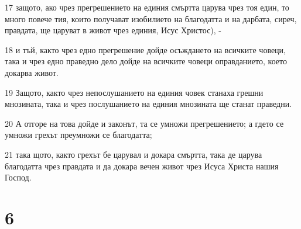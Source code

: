 \par 17 защото, ако чрез прегрешението на единия смъртта царува чрез тоя един, то много повече тия, които получават изобилието на благодатта и на дарбата, сиреч, правдата, ще царуват в живот чрез единия, Исус Христос), -
\par 18 и тъй, както чрез едно прегрешение дойде осъждането на всичките човеци, така и чрез едно праведно дело дойде на всичките човеци оправданието, което докарва живот.
\par 19 Защото, както чрез непослушанието на единия човек станаха грешни мнозината, така и чрез послушанието на единия мнозината ще станат праведни.
\par 20 А отгоре на това дойде и законът, та се умножи прегрешението; а гдето се умножи грехът преумножи се благодатта;
\par 21 така щото, както грехът бе царувал и докара смъртта, така де царува благодатта чрез правдата и да докара вечен живот чрез Исуса Христа нашия Господ.

\chapter{6}


